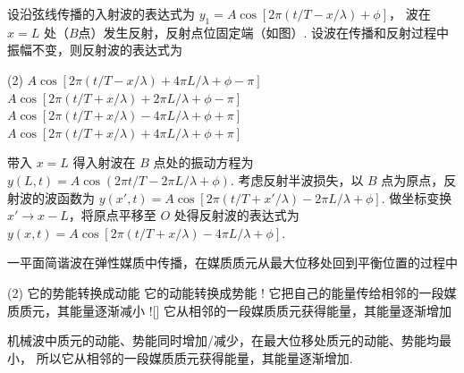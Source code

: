 \begin{textfig}
  \begin{problem}
    设沿弦线传播的入射波的表达式为 $y_1 = A\cos[2\pi(t/T - x/\lambda) + \phi]$，
    波在 $x = L$ 处（$B$点）发生反射，反射点位固定端（如图）.
    设波在传播和反射过程中振幅不变，则反射波的表达式为
    \begin{tasks}(2)
      \task $A\cos[2\pi(t/T - x/\lambda) + 4\pi L/\lambda + \phi - \pi]$
      \task $A\cos[2\pi(t/T + x/\lambda) + 2\pi L/\lambda + \phi - \pi]$
      \task[\true] $A\cos[2\pi(t/T + x/\lambda) - 4\pi L/\lambda + \phi + \pi]$
      \task $A\cos[2\pi(t/T + x/\lambda) + 4\pi L/\lambda + \phi + \pi]$
    \end{tasks}
  \end{problem}
  \textfigsplit\centering
\end{textfig}
\scratch[12ex]
\begin{solution}
  带入 $x = L$ 得入射波在 $B$ 点处的振动方程为
  $y (L,t) = A\cos(2\pi t/T - 2\pi L/\lambda + \phi)$.
  考虑反射半波损失，以 $B$ 点为原点，反射波的波函数为
  $y (x',t) = A\cos[2\pi(t/T + x'/\lambda) - 2\pi L/\lambda + \phi]$.
  做坐标变换 $x' \to x - L$，将原点平移至 $O$ 处得反射波的表达式为
  $ y (x,t) = A\cos[2\pi(t/T + x/\lambda) - 4\pi L/\lambda + \phi]$.
\end{solution}

\begin{problem}
  一平面简谐波在弹性媒质中传播，在媒质质元从最大位移处回到平衡位置的过程中
  \begin{tasks}(2)
    \task 它的势能转换成动能
    \task 它的动能转换成势能
    \task! 它把自己的能量传给相邻的一段媒质质元，其能量逐渐减小
    \task![\true] 它从相邻的一段媒质质元获得能量，其能量逐渐增加
  \end{tasks}
\end{problem}
\scratch[4ex]
\begin{solution}
  机械波中质元的动能、势能同时增加/减少，在最大位移处质元的动能、势能均最小，
  所以它从相邻的一段媒质质元获得能量，其能量逐渐增加.
\end{solution}

